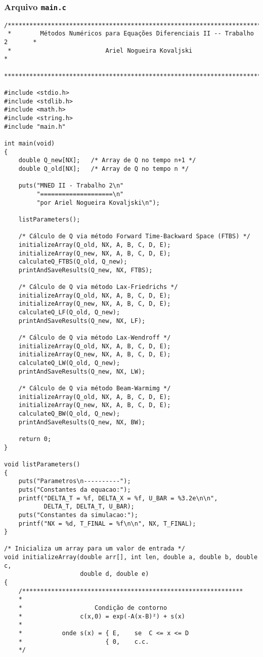 \subsubsection{Arquivo \texttt{main.c}}
\begin{Verbatim}[fontsize=\footnotesize]
/******************************************************************************
 *        Métodos Numéricos para Equações Diferenciais II -- Trabalho 2       *
 *                          Ariel Nogueira Kovaljski                          *
 ******************************************************************************/

#include <stdio.h>
#include <stdlib.h>
#include <math.h>
#include <string.h>
#include "main.h"

int main(void)
{
    double Q_new[NX];   /* Array de Q no tempo n+1 */
    double Q_old[NX];   /* Array de Q no tempo n */

    puts("MNED II - Trabalho 2\n"
         "====================\n"
         "por Ariel Nogueira Kovaljski\n");

    listParameters();

    /* Cálculo de Q via método Forward Time-Backward Space (FTBS) */
    initializeArray(Q_old, NX, A, B, C, D, E);
    initializeArray(Q_new, NX, A, B, C, D, E);
    calculateQ_FTBS(Q_old, Q_new);
    printAndSaveResults(Q_new, NX, FTBS);

    /* Cálculo de Q via método Lax-Friedrichs */
    initializeArray(Q_old, NX, A, B, C, D, E);
    initializeArray(Q_new, NX, A, B, C, D, E);
    calculateQ_LF(Q_old, Q_new);
    printAndSaveResults(Q_new, NX, LF);

    /* Cálculo de Q via método Lax-Wendroff */
    initializeArray(Q_old, NX, A, B, C, D, E);
    initializeArray(Q_new, NX, A, B, C, D, E);
    calculateQ_LW(Q_old, Q_new);
    printAndSaveResults(Q_new, NX, LW);

    /* Cálculo de Q via método Beam-Warmimg */
    initializeArray(Q_old, NX, A, B, C, D, E);
    initializeArray(Q_new, NX, A, B, C, D, E);
    calculateQ_BW(Q_old, Q_new);
    printAndSaveResults(Q_new, NX, BW);

    return 0;
}

void listParameters()
{
    puts("Parametros\n----------");
    puts("Constantes da equacao:");
    printf("DELTA_T = %f, DELTA_X = %f, U_BAR = %3.2e\n\n",
           DELTA_T, DELTA_T, U_BAR);
    puts("Constantes da simulacao:");
    printf("NX = %d, T_FINAL = %f\n\n", NX, T_FINAL);
}

/* Inicializa um array para um valor de entrada */
void initializeArray(double arr[], int len, double a, double b, double c,
                     double d, double e)
{
    /*************************************************************
    *
    *                    Condição de contorno
    *                c(x,0) = exp(-A(x-B)²) + s(x)
    *
    *           onde s(x) = { E,    se  C <= x <= D
    *                       { 0,    c.c.
    */


\end{Verbatim}
